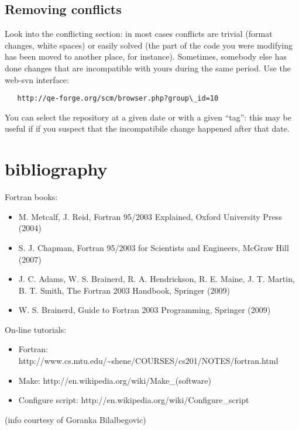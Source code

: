 \documentclass[12pt,a4paper]{article}
\begin{document}
\subsection{Removing conflicts}
\label{SubSec:Conflicts}
  Look into the conflicting section: in
  most cases conflicts are trivial (format changes, white spaces) or
  easily solved (the part of the code you were modifying has been
  moved to another place, for instance). Sometimes, somebody else has
  done changes that are incompatible with yours during the same
  period. Use the web-svn interface:
\begin{verbatim}
   http://qe-forge.org/scm/browser.php?group\_id=10
\end{verbatim}
  You can select the repository at a given date or with a given ``tag'': 
  this may be useful if if you suspect that the incompatibile 
  change happened after that date. 

\section{bibliography}

Fortran books:
\begin{itemize}
\item 
M. Metcalf, J. Reid, Fortran 95/2003 Explained, Oxford University Press (2004) 
\item
S. J. Chapman, Fortran 95/2003 for Scientists and Engineers, McGraw Hill (2007) 
\item
J. C. Adams, W. S. Brainerd, R. A. Hendrickson, R. E. Maine, J. T. Martin,
B. T. Smith, The Fortran 2003 Handbook, Springer (2009) 
\item
W. S. Brainerd, Guide to Fortran 2003 Programming, Springer (2009)
\end{itemize}
On-line tutorials:
\begin{itemize}
\item Fortran:
http://www.cs.mtu.edu/\~{}shene/COURSES/cs201/NOTES/fortran.html
\item Make:  
http://en.wikipedia.org/wiki/Make\_(software)
\item Configure script:
http://en.wikipedia.org/wiki/Configure\_script
\end{itemize}
(info courtesy of Goranka Bilalbegovic)
\end{document}
